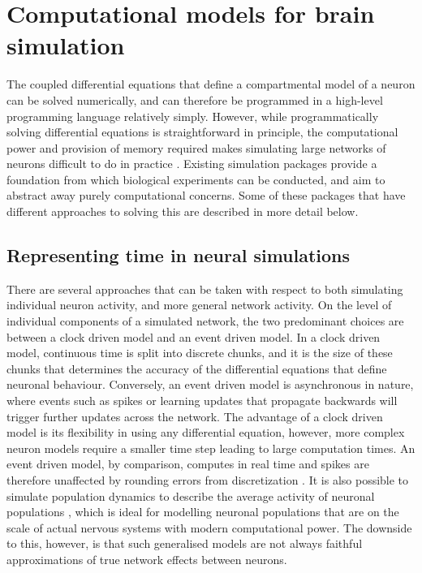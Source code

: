 

\section{Computational models for brain simulation}

The coupled differential equations that define a compartmental model of a neuron
can be solved numerically, and can therefore be programmed in a high-level
programming language relatively simply. However, while programmatically solving
differential equations is straightforward in principle, the computational power
and provision of memory required makes simulating large networks of neurons
difficult to do in practice \autocite{trappenberg_fundamentals_2009}. Existing
simulation packages provide a foundation from which biological experiments can
be conducted, and aim to abstract away purely computational concerns. Some of
these packages that have different approaches to solving this are described in
more detail below.

\subsection{Representing time in neural simulations}

There are several approaches that can be taken with respect to both simulating
individual neuron activity, and more general network activity. On the level of
individual components of a simulated network, the two predominant choices are
between a clock driven model and an event driven model. In a clock driven model,
continuous time is split into discrete chunks, and it is the size of these
chunks that determines the accuracy of the differential equations that define
neuronal behaviour. Conversely, an event driven model is asynchronous in nature,
where events such as spikes or learning updates that propagate backwards will
trigger further updates across the network. The advantage of a clock driven
model is its flexibility in using any differential equation, however, more
complex neuron models require a smaller time step leading to large computation
times. An event driven model, by comparison, computes in real time and spikes
are therefore unaffected by rounding errors from discretization
\autocite{brette_simulation_2007}. It is also possible to simulate population
dynamics to describe the average activity of neuronal populations
\autocite{trappenberg_fundamentals_2009}, which is ideal for modelling neuronal
populations that are on the scale of actual nervous systems with modern
computational power. The downside to this, however, is that such generalised
models are not always faithful approximations of true network effects between
neurons.

